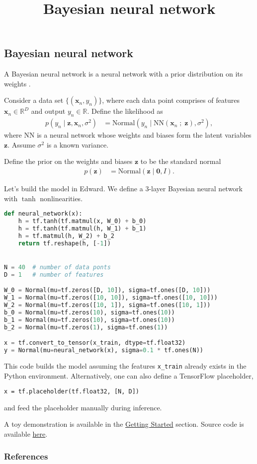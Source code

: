 \title{Bayesian neural network}

\subsection{Bayesian neural network}

A Bayesian neural network is a neural network with a prior
distribution on its weights \citep{neal2012bayesian}.

Consider a data set $\{(\mathbf{x}_n, y_n)\}$, where each data point
comprises of features $\mathbf{x}_n\in\mathbb{R}^D$ and output
$y_n\in\mathbb{R}$. Define the likelihood as
\begin{align*}
  p(y_n \mid \mathbf{z}, \mathbf{x}_n, \sigma^2)
  &=
  \text{Normal}(y_n \mid \mathrm{NN}(\mathbf{x}_n\;;\;\mathbf{z}), \sigma^2),
\end{align*}
where $\mathrm{NN}$ is a neural network whose weights and biases form
the latent variables $\mathbf{z}$. Assume $\sigma^2$ is a
known variance.

Define the prior on the weights and biases $\mathbf{z}$ to be the standard normal
\begin{align*}
  p(\mathbf{z})
  &=
  \text{Normal}(\mathbf{z} \mid \mathbf{0}, I).
\end{align*}

Let's build the model in Edward. We define a 3-layer Bayesian neural
network with $\tanh$ nonlinearities.
\begin{lstlisting}[language=Python]
def neural_network(x):
    h = tf.tanh(tf.matmul(x, W_0) + b_0)
    h = tf.tanh(tf.matmul(h, W_1) + b_1)
    h = tf.matmul(h, W_2) + b_2
    return tf.reshape(h, [-1])


N = 40  # number of data ponts
D = 1   # number of features

W_0 = Normal(mu=tf.zeros([D, 10]), sigma=tf.ones([D, 10]))
W_1 = Normal(mu=tf.zeros([10, 10]), sigma=tf.ones([10, 10]))
W_2 = Normal(mu=tf.zeros([10, 1]), sigma=tf.ones([10, 1]))
b_0 = Normal(mu=tf.zeros(10), sigma=tf.ones(10))
b_1 = Normal(mu=tf.zeros(10), sigma=tf.ones(10))
b_2 = Normal(mu=tf.zeros(1), sigma=tf.ones(1))

x = tf.convert_to_tensor(x_train, dtype=tf.float32)
y = Normal(mu=neural_network(x), sigma=0.1 * tf.ones(N))
\end{lstlisting}
This code builds the model assuming the features \texttt{x\_train}
already exists in the Python environment. Alternatively, one can also
define a TensorFlow placeholder,
\begin{lstlisting}
x = tf.placeholder(tf.float32, [N, D])
\end{lstlisting}
and feed the placeholder manually during inference.

A toy demonstration is available in the \href{/getting-started}{Getting Started} section.
Source code is available
\href{https://github.com/blei-lab/edward/blob/master/examples/bayesian_nn.py}
{here}.

\subsubsection{References}\label{references}
